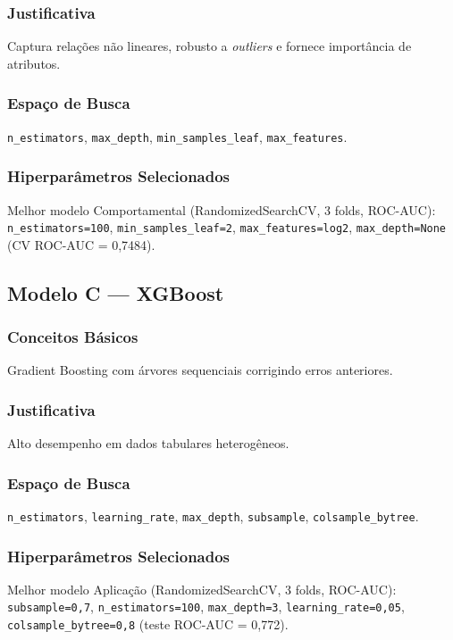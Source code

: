 \documentclass[conference]{IEEEtran}
\newcommand{\code}[1]{\texttt{#1}}
\begin{document}
\subsubsection{Justificativa}
Captura relações não lineares, robusto a \textit{outliers} e fornece importância de atributos.

\subsubsection{Espaço de Busca}
\code{n\_estimators}, \code{max\_depth}, \code{min\_samples\_leaf}, \code{max\_features}.

\subsubsection{Hiperparâmetros Selecionados}
Melhor modelo Comportamental (RandomizedSearchCV, 3 folds, ROC-AUC): \code{n\_estimators=100}, \code{min\_samples\_leaf=2}, \code{max\_features=log2}, \code{max\_depth=None} (CV ROC-AUC = 0,7484).

\subsection{Modelo C --- XGBoost}

\subsubsection{Conceitos Básicos}
Gradient Boosting com árvores sequenciais corrigindo erros anteriores.

\subsubsection{Justificativa}
Alto desempenho em dados tabulares heterogêneos.

\subsubsection{Espaço de Busca}
\code{n\_estimators}, \code{learning\_rate}, \code{max\_depth}, \code{subsample}, \code{colsample\_bytree}.

\subsubsection{Hiperparâmetros Selecionados}
Melhor modelo Aplicação (RandomizedSearchCV, 3 folds, ROC-AUC): \code{subsample=0,7}, \code{n\_estimators=100}, \code{max\_depth=3}, \code{learning\_rate=0,05}, \code{colsample\_bytree=0,8} (teste ROC-AUC = 0,772).
\end{document}
